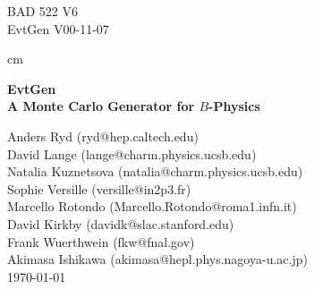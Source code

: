 
%
%
\addtolength{\topmargin}{-0.75in}
\addtolength{\textwidth}{1.1in}
\addtolength{\textheight}{1.25in}
\addtolength{\hoffset}{-0.6in}


\makeindex



\begin{flushright}
BAD 522 V6\\
EvtGen V00-11-07
\end{flushright}

 cm


\begin{center}
\bf \Large {\bf EvtGen\\ 
A Monte Carlo Generator for $B$-Physics}
\end{center}

\begin{center}
Anders Ryd (ryd@hep.caltech.edu)\\
David Lange (lange@charm.physics.ucsb.edu)\\
Natalia Kuznetsova (natalia@charm.physics.ucsb.edu)\\
Sophie Versille (versille@in2p3.fr)\\
Marcello Rotondo (Marcello.Rotondo@roma1.infn.it)\\
David Kirkby (davidk@slac.stanford.edu)\\
Frank Wuerthwein (fkw@fnal.gov)\\
Akimasa Ishikawa (akimasa@hepl.phys.nagoya-u.ac.jp)\\
{\today} \\
\end{center}

\begin{abstract}
\smallskip
This note describes EvtGen, an event generator that 
is well suited for $B$ physics. It implements many
detailed models that are important for the
physics of $B$ mesons. In particular, it has detailed
models for semileptonic decays, $CP$-violating decays and
produces correct results for the angular distributions
in sequential decays, including all correlations.
It also has an interface to JetSet for generation of 
continuum at the $\Upsilon(4S)$ and for generic hadronic
decays, e.g. of $B$ mesons, that are not implemented in the
generator.   
\end{abstract}

\newpage

\tableofcontents

